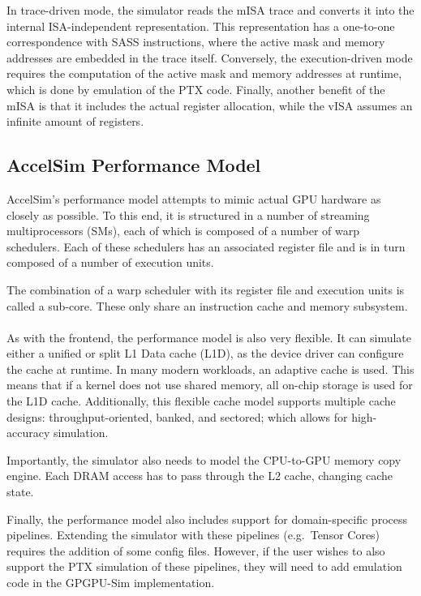 In trace-driven mode, the simulator reads the mISA trace and converts it into the internal ISA-independent representation.
This representation has a one-to-one correspondence with SASS instructions, where the active mask and memory addresses are embedded in the trace itself.
Conversely, the execution-driven mode requires the computation of the active mask and memory addresses at runtime, which is done by emulation of the PTX code.
Finally, another benefit of the mISA is that it includes the actual register allocation, while the vISA assumes an infinite amount of registers.

\subsection{AccelSim Performance Model}\label{subsec:accelsim-performance-model}
AccelSim's performance model attempts to mimic actual GPU hardware as closely as possible.
To this end, it is structured in a number of streaming multiprocessors (SMs), each of which is composed of a number of warp schedulers.
Each of these schedulers has an associated register file and is in turn composed of a number of execution units.

The combination of a warp scheduler with its register file and execution units is called a sub-core.
These only share an instruction cache and memory subsystem.
\\
\\
As with the frontend, the performance model is also very flexible.
It can simulate either a unified or split L1 Data cache (L1D), as the device driver can configure the cache at runtime.
In many modern workloads, an adaptive cache is used.
This means that if a kernel does not use shared memory, all on-chip storage is used for the L1D cache.
Additionally, this flexible cache model supports multiple cache designs: throughput-oriented, banked, and sectored; which allows for high-accuracy simulation.

Importantly, the simulator also needs to model the CPU-to-GPU memory copy engine.
Each DRAM access has to pass through the L2 cache, changing cache state.

Finally, the performance model also includes support for domain-specific process pipelines.
Extending the simulator with these pipelines (e.g.\ Tensor Cores) requires the addition of some config files.
However, if the user wishes to also support the PTX simulation of these pipelines, they will need to add emulation code in the GPGPU-Sim implementation.

